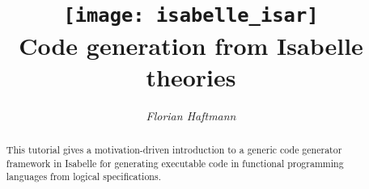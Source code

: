 \documentclass[12pt,a4paper,fleqn]{report}
\title{\texttt{[image: isabelle\_isar]}
  \\[4ex] Code generation from Isabelle theories}
\author{\emph{Florian Haftmann}}
\begin{document}
\maketitle

\begin{abstract}
  This tutorial gives a motivation-driven introduction
  to a generic code generator framework in Isabelle
  for generating executable code in functional
  programming languages from logical specifications.
\end{abstract}

\thispagestyle{empty}\clearpage

\clearfirst



\begingroup
 \small\raggedright\frenchspacing

\endgroup
\end{document}
